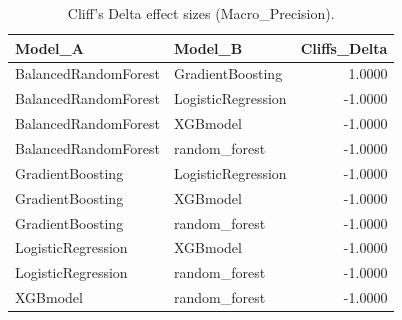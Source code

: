 \begin{table}[t]
\centering
\begin{tabular}{llr}
\toprule
Model_A & Model_B & Cliffs_Delta \\
\midrule
BalancedRandomForest & GradientBoosting & 1.0000 \\
BalancedRandomForest & LogisticRegression & -1.0000 \\
BalancedRandomForest & XGBmodel & -1.0000 \\
BalancedRandomForest & random_forest & -1.0000 \\
GradientBoosting & LogisticRegression & -1.0000 \\
GradientBoosting & XGBmodel & -1.0000 \\
GradientBoosting & random_forest & -1.0000 \\
LogisticRegression & XGBmodel & -1.0000 \\
LogisticRegression & random_forest & -1.0000 \\
XGBmodel & random_forest & -1.0000 \\
\bottomrule
\end{tabular}
\caption{Cliff's Delta effect sizes (Macro_Precision).}
\label{tab:cliffs_Macro_Precision}
\end{table}